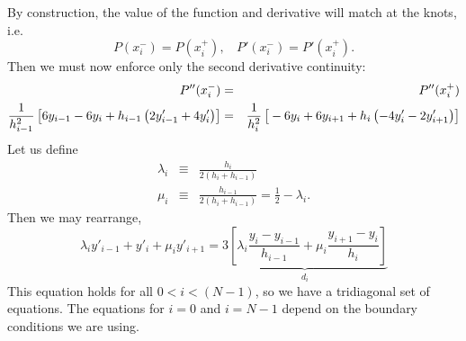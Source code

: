 By construction, the value of the function and derivative will match
at the knots, i.e.
\begin{equation}
P(x_i^-) = P(x_i^+), \ \ \ \ P'(x_i^-) = P'(x_i^+).
\end{equation}
Then we must now enforce only the second derivative continuity:
\begin{eqnarray}
P''(x_i^-) & = & P''(x_i^+) \\
\frac{1}{h_{i-1}^2}\left[\rule{0pt}{0.3cm}6 y_{i-1} -6 y_i + h_{i-1}\left(2 y'_{i-1} +4 y'_i\right) \right]& = &
\frac{1}{h_i^2}\left[\rule{0pt}{0.3cm}-6 y_i + 6 y_{i+1} +h_i\left( -4 y'_i -2 y'_{i+1} \right)\right] \nonumber
\end{eqnarray}
Let us define
\begin{eqnarray}
\lambda_i & \equiv & \frac{h_i}{2(h_i+h_{i-1})} \\
\mu_i & \equiv & \frac{h_{i-1}}{2(h_i+h_{i-1})}  = \frac{1}{2} - \lambda_i.
\end{eqnarray}
Then we may rearrange,
\begin{equation}
\lambda_i y'_{i-1} + y'_i + \mu_i y'_{i+1} = \underbrace{3 \left[\lambda_i \frac{y_i - y_{i-1}}{h_{i-1}} + \mu_i \frac{y_{i+1}
    - y_i}{h_i} \right] }_{d_i}
\end{equation}
This equation holds for all $0<i<(N-1)$, so we have a tridiagonal set of
equations.  The equations for $i=0$ and $i=N-1$ depend on the boundary
conditions we are using.  
